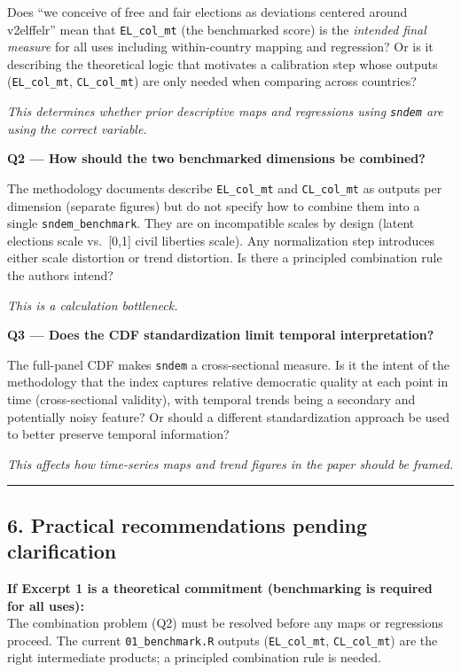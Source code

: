 \documentclass[
]{article}
\begin{document}
Does ``we conceive of free and fair elections as deviations centered
around v2elffelr'' mean that \texttt{EL\_col\_mt} (the benchmarked
score) is the \emph{intended final measure} for all uses including
within-country mapping and regression? Or is it describing the
theoretical logic that motivates a calibration step whose outputs
(\texttt{EL\_col\_mt}, \texttt{CL\_col\_mt}) are only needed when
comparing across countries?

\emph{This determines whether prior descriptive maps and regressions
using \texttt{sndem} are using the correct variable.}

\textbf{Q2 --- How should the two benchmarked dimensions be combined?}

The methodology documents describe \texttt{EL\_col\_mt} and
\texttt{CL\_col\_mt} as outputs per dimension (separate figures) but do
not specify how to combine them into a single \texttt{sndem\_benchmark}.
They are on incompatible scales by design (latent elections scale
vs.~{[}0,1{]} civil liberties scale). Any normalization step introduces
either scale distortion or trend distortion. Is there a principled
combination rule the authors intend?

\emph{This is a calculation bottleneck.}

\textbf{Q3 --- Does the CDF standardization limit temporal
interpretation?}

The full-panel CDF makes \texttt{sndem} a cross-sectional measure. Is it
the intent of the methodology that the index captures relative
democratic quality at each point in time (cross-sectional validity),
with temporal trends being a secondary and potentially noisy feature? Or
should a different standardization approach be used to better preserve
temporal information?

\emph{This affects how time-series maps and trend figures in the paper
should be framed.}

\begin{center}\rule{0.5\linewidth}{0.5pt}\end{center}

\subsection{6. Practical recommendations pending
clarification}\label{practical-recommendations-pending-clarification}

\textbf{If Excerpt 1 is a theoretical commitment (benchmarking is
required for all uses):}\\
The combination problem (Q2) must be resolved before any maps or
regressions proceed. The current \texttt{01\_benchmark.R} outputs
(\texttt{EL\_col\_mt}, \texttt{CL\_col\_mt}) are the right intermediate
products; a principled combination rule is needed.
\end{document}
